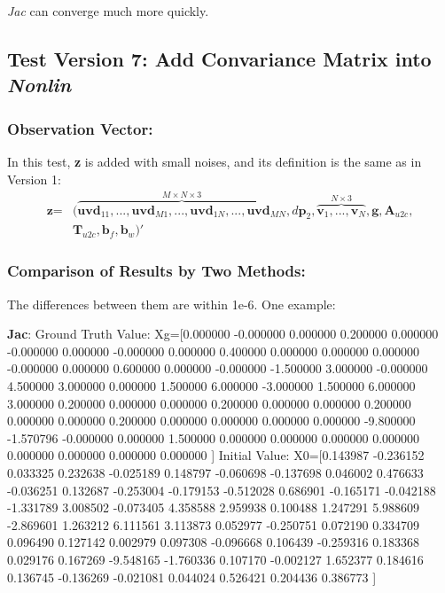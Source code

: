 \documentclass[12pt]{article}   %
\begin{document}
\textit{Jac} can converge much more quickly.


\subsection{Test Version 7: Add Convariance Matrix into \textit{Nonlin}}
\subsubsection{Observation Vector:}
In this test, \textbf{z} is added with small noises, and its definition is the same as in Version 1:
\begin{align*}
\textbf{z}=&(\overbrace{\textbf{uvd}_{11}, ... , \textbf{uvd}_{M1}, ..., \textbf{uvd}_{1N}, ... , \textbf{uvd}_{MN}}^{M \times N \times 3}, d\textbf{p}_2, \overbrace{\textbf{v}_1, ..., \textbf{v}_{N}}^{N \times 3},  \textbf{g}, \textbf{A}_{u2c},\\
 &\textbf{T}_{u2c}, \textbf{b}_f, \textbf{b}_w)' 
 \end{align*}

\subsubsection{Comparison of Results by Two Methods:}	

The differences between them are within 1e-6. One example:

\textbf{Jac}:
Ground Truth Value:
	 Xg=[0.000000 -0.000000 0.000000 0.200000 0.000000 -0.000000 0.000000 -0.000000 0.000000 0.400000 0.000000 0.000000 0.000000 -0.000000 0.000000 0.600000 0.000000 -0.000000 -1.500000 3.000000 -0.000000 4.500000 3.000000 0.000000 1.500000 6.000000 -3.000000 1.500000 6.000000 3.000000 0.200000 0.000000 0.000000 0.200000 0.000000 0.000000 0.200000 0.000000 0.000000 0.200000 0.000000 0.000000 0.000000 0.000000 -9.800000 -1.570796 -0.000000 0.000000 1.500000 0.000000 0.000000 0.000000 0.000000 0.000000 0.000000 0.000000 0.000000 ]
Initial Value:
	 X0=[0.143987 -0.236152 0.033325 0.232638 -0.025189 0.148797 -0.060698 -0.137698 0.046002 0.476633 -0.036251 0.132687 -0.253004 -0.179153 -0.512028 0.686901 -0.165171 -0.042188 -1.331789 3.008502 -0.073405 4.358588 2.959938 0.100488 1.247291 5.988609 -2.869601 1.263212 6.111561 3.113873 0.052977 -0.250751 0.072190 0.334709 0.096490 0.127142 0.002979 0.097308 -0.096668 0.106439 -0.259316 0.183368 0.029176 0.167269 -9.548165 -1.760336 0.107170 -0.002127 1.652377 0.184616 0.136745 -0.136269 -0.021081 0.044024 0.526421 0.204436 0.386773 ]
\end{document}
